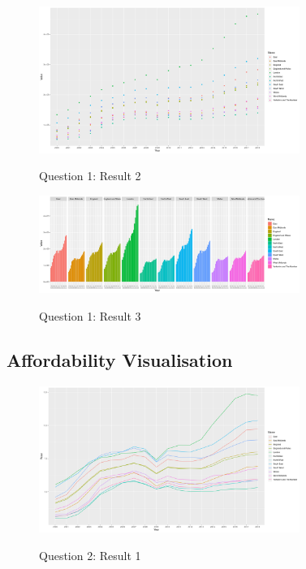 \documentclass{article}
\begin{document}
\begin{figure}[htb]
  \begin{minipage}[b]{1.0\linewidth}
    \centering
    \centerline{\includegraphics[width=8.5cm]{Q1Geom_point}}
    \centerline{Question 1: Result 2}\medskip
  \end{minipage}
\end{figure}

\begin{figure}[htb]
  \begin{minipage}[b]{1.0\linewidth}
    \centering
    \centerline{\includegraphics[width=8.5cm]{Q1Geom_gridbar}}
    \centerline{Question 1: Result 3}\medskip
  \end{minipage}
\end{figure}



\subsection{Affordability Visualisation}

\begin{figure}[htb]
  \begin{minipage}[b]{1.0\linewidth}
    \centering
    \centerline{\includegraphics[width=8.5cm]{Q2Geom_line}}
    \centerline{Question 2: Result 1}\medskip
  \end{minipage}
\end{figure}
\end{document}

